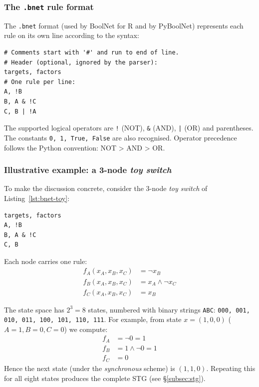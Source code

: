 \documentclass[oneside,final]{hcmut-report}
\begin{document}
\subsubsection{The \texttt{.bnet} rule format}

The \texttt{.bnet} format (used by BoolNet for R and by PyBoolNet) represents each rule on its own line according to the syntax:
\begin{lstlisting}[style=bnetStyle, caption={\texttt{.bnet} file syntax}, label={lst:bnet-syntax}]
# Comments start with '#' and run to end of line.
# Header (optional, ignored by the parser):
targets, factors
# One rule per line:
A, !B
B, A & !C
C, B | !A
\end{lstlisting}

The supported logical operators are \texttt{!} (NOT), \texttt{\&} (AND), \texttt{|} (OR) and parentheses. The constants \texttt{0, 1, True, False} are also recognised. Operator precedence follows the Python convention: NOT > AND > OR.

\subsubsection{Illustrative example: a 3-node \textit{toy switch}}

To make the discussion concrete, consider the 3-node \textit{toy switch} of Listing~\ref{lst:bnet-toy}:

\begin{lstlisting}[style=bnetStyle, caption={The 3-node \textit{toy switch} network}, label={lst:bnet-toy}]
targets, factors
A, !B
B, A & !C
C, B
\end{lstlisting}

Each node carries one rule:
\begin{align*}
f_A(x_A, x_B, x_C) &= \lnot x_B \\
f_B(x_A, x_B, x_C) &= x_A \land \lnot x_C \\
f_C(x_A, x_B, x_C) &= x_B
\end{align*}

The state space has $2^3 = 8$ states, numbered with binary strings \texttt{ABC}: \texttt{000, 001, 010, 011, 100, 101, 110, 111}. For example, from state $x = (1, 0, 0)$ ($A=1, B=0, C=0$) we compute:
\begin{align*}
f_A &= \lnot 0 = 1 \\
f_B &= 1 \land \lnot 0 = 1 \\
f_C &= 0
\end{align*}
Hence the next state (under the \textit{synchronous} scheme) is $(1, 1, 0)$. Repeating this for all eight states produces the complete STG (see \S\ref{subsec:stg}).
\end{document}
